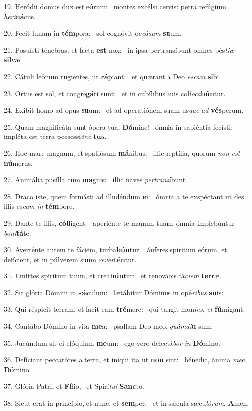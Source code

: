 19. Heródii domus dux est e\textbf{ó}rum: \ast\  montes excélsi cervis: petra refúgium \textit{he}\textit{ri}\textbf{ná}ciis.\

20. Fecit lunam in \textbf{tém}pora: \ast\  sol cognóvit oc\textit{cá}\textit{sum} \textbf{su}um.\

21. Posuísti ténebras, et facta \textbf{est} nox: \ast\  in ipsa pertransíbunt omnes bés\textit{ti}\textit{æ} \textbf{sil}væ.\

22. Cátuli leónum rugiéntes, ut \textbf{rá}piant: \ast\  et quærant a Deo \textit{es}\textit{cam} \textbf{si}bi.\

23. Ortus est sol, et congre\textbf{gá}ti sunt: \ast\  et in cubílibus suis col\textit{lo}\textit{ca}\textbf{bún}tur.\

24. Exíbit homo ad opus \textbf{su}um: \ast\  et ad operatiónem suam us\textit{que} \textit{ad} \textbf{vés}perum.\

25. Quam magnificáta sunt ópera tua, \textbf{Dó}mine! \ast\  ómnia in sapiéntia fecísti: impléta est terra possessi\textit{ó}\textit{ne} \textbf{tu}a.\

26. Hoc mare magnum, et spatiósum \textbf{má}nibus: \ast\  illic reptília, quorum \textit{non} \textit{est} \textbf{nú}merus.\

27. Animália pusílla cum \textbf{ma}gnis: \ast\  illic naves \textit{per}\textit{trans}\textbf{í}bunt.\

28. Draco iste, quem formásti ad illudéndum \textbf{e}i: \ast\  ómnia a te exspéctant ut des illis es\textit{cam} \textit{in} \textbf{tém}pore.\

29. Dante te illis, \textbf{cól}ligent: \ast\  aperiénte te manum tuam, ómnia implebúntur \textit{bo}\textit{ni}\textbf{tá}te.\

30. Averténte autem te fáciem, turba\textbf{bún}tur: \ast\  áuferes spíritum eórum, et defícient, et in púlverem suum \textit{re}\textit{ver}\textbf{tén}tur.\

31. Emíttes spíritum tuum, et crea\textbf{bún}tur: \ast\  et renovábis fá\textit{ci}\textit{em} \textbf{ter}ræ.\

32. Sit glória Dómini in \textbf{sǽ}culum: \ast\  lætábitur Dóminus in opé\textit{ri}\textit{bus} \textbf{su}is:\

33. Qui réspicit terram, et facit eam \textbf{tré}mere: \ast\  qui tangit mon\textit{tes}, \textit{et} \textbf{fú}migant.\

34. Cantábo Dómino in vita \textbf{me}a: \ast\  psallam Deo meo, \textit{quám}\textit{di}\textbf{u} sum.\

35. Jucúndum sit ei elóquium \textbf{me}um: \ast\  ego vero delectá\textit{bor} \textit{in} \textbf{Dó}mino.\

36. Defíciant peccatóres a terra, et iníqui ita ut \textbf{non} sint: \ast\  bénedic, ánima \textit{me}\textit{a}, \textbf{Dó}mino.\

37. Glória Patri, et \textbf{Fí}lio, \ast\  et Spirí\textit{tu}\textit{i} \textbf{Sanc}to.\

38. Sicut erat in princípio, et nunc, et \textbf{sem}per, \ast\  et in sǽcula sæcu\textit{ló}\textit{rum}. \textbf{A}men.\

